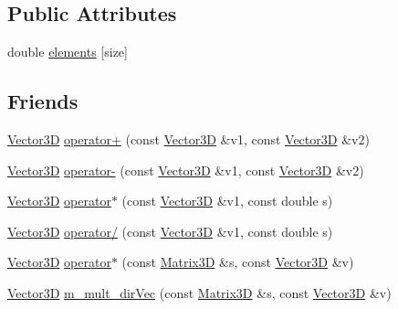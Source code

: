 \subsection*{Public Attributes}
\begin{DoxyCompactItemize}
\item 
double \hyperlink{class_vector3_d_a3c92dcba304b8b23c9961eb5ccfbed63}{elements} \mbox{[}size\mbox{]}
\end{DoxyCompactItemize}
\subsection*{Friends}
\begin{DoxyCompactItemize}
\item 
\hyperlink{class_vector3_d}{Vector3\-D} \hyperlink{class_vector3_d_ac6411f933860f0e12b87da2ec1698197}{operator+} (const \hyperlink{class_vector3_d}{Vector3\-D} \&v1, const \hyperlink{class_vector3_d}{Vector3\-D} \&v2)
\item 
\hyperlink{class_vector3_d}{Vector3\-D} \hyperlink{class_vector3_d_ae2b0c437a1ccad22fc33fd9750079e5e}{operator-\/} (const \hyperlink{class_vector3_d}{Vector3\-D} \&v1, const \hyperlink{class_vector3_d}{Vector3\-D} \&v2)
\item 
\hyperlink{class_vector3_d}{Vector3\-D} \hyperlink{class_vector3_d_a37a1cbe0594313bd52fe13f50011add1}{operator$\ast$} (const \hyperlink{class_vector3_d}{Vector3\-D} \&v1, const double s)
\item 
\hyperlink{class_vector3_d}{Vector3\-D} \hyperlink{class_vector3_d_ab833cc21e16fad258cc5445e7798aea4}{operator/} (const \hyperlink{class_vector3_d}{Vector3\-D} \&v1, const double s)
\item 
\hyperlink{class_vector3_d}{Vector3\-D} \hyperlink{class_vector3_d_a7ab094401d4017867594d9e321bde89c}{operator$\ast$} (const \hyperlink{class_matrix3_d}{Matrix3\-D} \&s, const \hyperlink{class_vector3_d}{Vector3\-D} \&v)
\item 
\hyperlink{class_vector3_d}{Vector3\-D} \hyperlink{class_vector3_d_afd02bcb799e94637ae32829e62d519b8}{m\-\_\-mult\-\_\-dir\-Vec} (const \hyperlink{class_matrix3_d}{Matrix3\-D} \&s, const \hyperlink{class_vector3_d}{Vector3\-D} \&v)
\end{DoxyCompactItemize}


